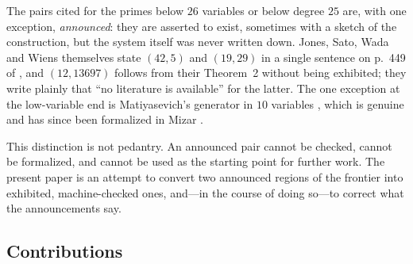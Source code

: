 The pairs cited for the primes below $26$ variables or below degree $25$ are,
with one exception, \emph{announced}: they are asserted to exist, sometimes with
a sketch of the construction, but the system itself was never written down.
Jones, Sato, Wada and Wiens themselves state $(42,5)$ and $(19,29)$ in a single
sentence on p.~449 of \cite{jsww1976}, and $(12,13697)$ follows from their
Theorem~2 without being exhibited; they write plainly that ``no literature is
available'' for the latter. The one exception at the low-variable end is
Matiyasevich's generator in $10$ variables \cite{matiyasevich1981}, which is
genuine and has since been formalized in Mizar \cite{pak2022ten}.

This distinction is not pedantry. An announced pair cannot be checked, cannot be
formalized, and cannot be used as the starting point for further work. The
present paper is an attempt to convert two announced regions of the frontier
into exhibited, machine-checked ones, and---in the course of doing so---to
correct what the announcements say.

\subsection{Contributions}

